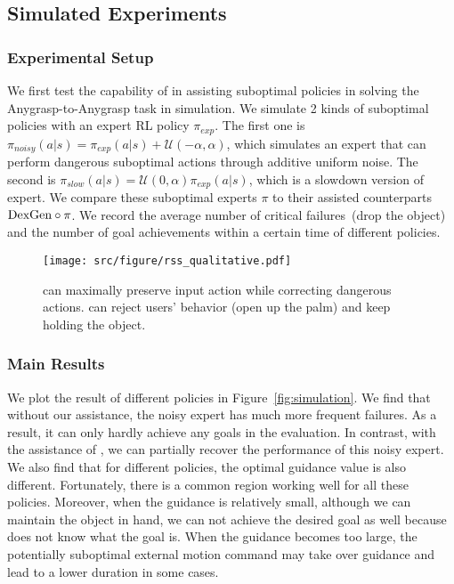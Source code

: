 \subsection{Simulated Experiments}

\subsubsection{Experimental Setup} 
We first test the capability of \mname{} in assisting suboptimal policies in solving the Anygrasp-to-Anygrasp task in simulation. We simulate 2 kinds of suboptimal policies with an expert RL policy $\pi_{exp}$. The first one is $\pi_{noisy}(a|s) = \pi_{exp}(a|s) + \mathcal{U}(-\alpha, \alpha)$, which simulates an expert that can perform dangerous suboptimal actions through additive uniform noise. The second is $\pi_{slow}(a|s) = \mathcal{U}(0, \alpha) \pi_{exp}(a|s)$, which is a slowdown version of expert. We compare these suboptimal experts $\pi$ to their assisted counterparts ${\rm DexGen{}}\circ \pi$. We record the average number of critical failures~(drop the object) and the number of goal achievements within a certain time of different policies. 

\begin{figure}[t]
    \centering
    \texttt{[image: src/figure/rss\_qualitative.pdf]}
    \caption{\mname{} can maximally preserve input action while correcting dangerous actions. \mname{} can reject users' behavior (open up the palm) and keep holding the object.}
    \label{fig:qual}
\end{figure}

\subsubsection{Main Results}  \quad We plot the result of different policies in Figure~\ref{fig:simulation}. We find that without our assistance, the noisy expert has much more frequent failures. As a result, it can only hardly achieve any goals in the evaluation. In contrast, with the assistance of \mname, we can partially recover the performance of this noisy expert. We also find that for different policies, the optimal guidance value is also different. Fortunately, there is a common region working well for all these policies. Moreover, when the guidance is relatively small, although we can maintain the object in hand, we can not achieve the desired goal as well because \mname{} does not know what the goal is. When the guidance becomes too large, the potentially suboptimal external motion command may take over \mname{} guidance and lead to a lower duration in some cases.  

